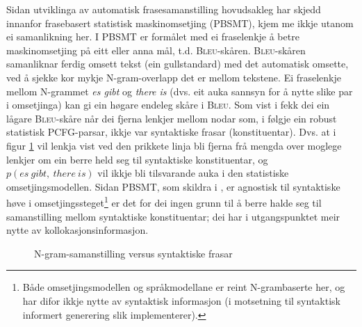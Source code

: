 \documentclass[11pt,a4paper,oneside,draft]{book}
\newcommand{\Bleu}{\textsc{Bleu}}
\begin{document}
Sidan utviklinga av automatisk frasesamanstilling hovudsakleg har
skjedd innanfor frasebasert statistisk maskinomsetjing (PBSMT), kjem
me ikkje utanom ei samanlikning her. I PBSMT er formålet med ei
fraselenkje å betre maskinomsetjing på eitt eller anna mål,
t.d. \Bleu-skåren. \Bleu-skåren samanliknar ferdig omsett tekst (ein
gullstandard) med det automatisk omsette, ved å sjekke kor mykje
N-gram-overlapp det er mellom tekstene. Ei fraselenkje mellom
N-grammet \emph{es gibt} og \emph{there is} (dvs. eit auka sannsyn for å nytte
slike par i omsetjinga) kan gi ein høgare endeleg skåre i \Bleu. Som
vist i \citet{koehn2003spb} fekk dei ein lågare \Bleu-skåre når dei
  fjerna lenkjer mellom nodar som, i følgje ein robust
statistisk PCFG-parsar, ikkje var syntaktiske frasar
(konstituentar). Dvs. at i figur \ref{fig:ikkjenode} vil lenkja vist
ved den prikkete linja bli fjerna frå mengda over moglege lenkjer om
ein berre held seg til syntaktiske konstituentar, og
$p(es~gibt,~there~is)$ vil ikkje bli tilsvarande auka i den
statistiske omsetjingsmodellen. Sidan PBSMT, som skildra i
\citet{koehn2003spb}, er agnostisk til syntaktiske høve i
omsetjingssteget\footnote{Både omsetjingsmodellen og språkmodellane er reint
      N-grambaserte her, og har difor ikkje nytte av syntaktisk
      informasjon (i motsetning til syntaktisk informert generering
      slik \citet{riezler2006gmt} implementerer). } er det for dei ingen grunn til å berre halde
seg til samanstilling mellom syntaktiske konstituentar; dei har i
utgangspunktet meir nytte av kollokasjonsinformasjon.

\begin{figure}[htp]
   \centering
   \caption{N-gram-samanstilling versus syntaktiske frasar}
    \label{fig:ikkjenode}
  \end{figure}
\end{document}
